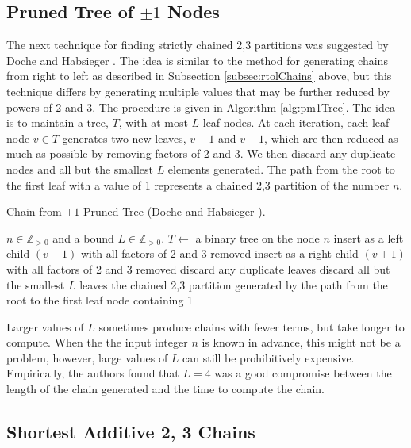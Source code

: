 \documentclass{ucalgthes1}
\theoremstyle{definition}
\newcommand{\ZZgtz}{\mathbb{Z}_{>0}}
\begin{document}
\bigbreak
\subsection{Pruned Tree of $\pm1$ Nodes}
\label{subsec:pm1Tree}

The next technique for finding strictly chained 2,3 partitions was suggested by Doche and Habsieger \cite{Doche2008}. The idea is similar to the method for generating chains from right to left as described in Subsection \ref{subsec:rtolChains} above, but this technique differs by generating multiple values that may be further reduced by powers of 2 and 3. The procedure is given in Algorithm \ref{alg:pm1Tree}.  The idea is to maintain a tree, $T$, with at most $L$ leaf nodes. At each iteration, each leaf node $v \in T$ generates two new leaves, $v-1$ and $v+1$, which are then reduced as much as possible by removing factors of 2 and 3.  We then discard any duplicate nodes and all but the smallest $L$ elements generated. The path from the root to the first leaf with a value of 1 represents a chained 2,3 partition of the number $n$.

\begin{algorithm}[h]
\caption{Chain from $\pm 1$ Pruned Tree (Doche and Habsieger \cite{Doche2008}).}
\label{alg:pm1Tree}
\begin{algorithmic}[1]
\REQUIRE $n \in \ZZgtz$ and a bound $L \in \ZZgtz$.
\STATE $T \gets$ a binary tree on the node $n$
		\STATE insert as a left child $(v - 1)$ with all factors of 2 and 3 removed
		\STATE insert as a right child $(v + 1)$ with all factors of 2 and 3 removed
	\ENDFOR
	\STATE discard any duplicate leaves
	\STATE discard all but the smallest $L$ leaves
\ENDWHILE
\RETURN the chained 2,3 partition generated by the path from the root to the first leaf node containing 1
\end{algorithmic}
\end{algorithm}

Larger values of $L$ sometimes produce chains with fewer terms, but take longer to compute.  When the the input integer $n$ is known in advance, this might not be a problem, however, large values of $L$ can still be prohibitively expensive.  Empirically, the authors found that $L=4$ was a good compromise between the length of the chain generated and the time to compute the chain. 


\subsection{Shortest Additive 2, 3 Chains}
\label{subsec:shortAddChains}
\end{document}

